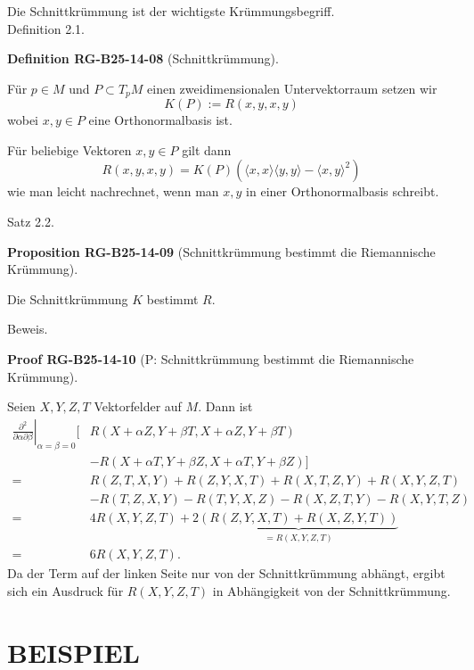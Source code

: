 \documentclass[10pt, letterpaper]{article}
\newcommand{\CustomHeading}[3]{%
  \par\medskip\noindent%
  \textbf{#1 #2} \textnormal{(#3)}.\enskip%
}
\newenvironment{DEF}[2]{\begin{unitbox}\CustomHeading{Definition}{#1}{#2}}{\end{unitbox}}
\newenvironment{PROP}[2]{\begin{unitbox}\CustomHeading{Proposition}{#1}{#2}}{\end{unitbox}}
\newenvironment{PROOF}[2]{\begin{unitbox}\CustomHeading{Proof}{#1}{#2}}{\end{unitbox}}
\begin{document}
Die Schnittkrümmung ist der wichtigste Krümmungsbegriff.\\



Definition 2.1. 


\begin{DEF}{RG-B25-14-08}{Schnittkrümmung}
Für $p \in M$ und $P \subset T_{p} M$ einen zweidimensionalen Untervektorraum setzen wir
$$
K(P):=R(x, y, x, y)
$$
wobei $x, y \in P$ eine Orthonormalbasis ist.

Für beliebige Vektoren $x, y \in P$ gilt dann
$$
R(x, y, x, y)=K(P)\left(\langle x, x\rangle\langle y, y\rangle-\langle x, y\rangle^{2}\right)
$$
wie man leicht nachrechnet, wenn man $x, y$ in einer Orthonormalbasis schreibt.
\end{DEF}



Satz 2.2. 

\begin{PROP}{RG-B25-14-09}{Schnittkrümmung bestimmt die Riemannische Krümmung}
Die Schnittkrümmung $K$ bestimmt $R$.
\end{PROP}


Beweis. 

\begin{PROOF}{RG-B25-14-10}{P: Schnittkrümmung bestimmt die Riemannische Krümmung}
Seien $X, Y, Z, T$ Vektorfelder auf $M$. Dann ist
$$
\begin{aligned}
\left.\frac{\partial^{2}}{\partial \alpha \partial \beta}\right|_{\alpha=\beta=0}[ & R(X+\alpha Z, Y+\beta T, X+\alpha Z, Y+\beta T) \\
& -R(X+\alpha T, Y+\beta Z, X+\alpha T, Y+\beta Z)] \\
= & R(Z, T, X, Y)+R(Z, Y, X, T)+R(X, T, Z, Y)+R(X, Y, Z, T) \\
& -R(T, Z, X, Y)-R(T, Y, X, Z)-R(X, Z, T, Y)-R(X, Y, T, Z) \\
= & 4 R(X, Y, Z, T)+2 \underbrace{(R(Z, Y, X, T)+R(X, Z, Y, T))}_{=R(X, Y, Z, T)} \\
= & 6 R(X, Y, Z, T) .
\end{aligned}
$$
Da der Term auf der linken Seite nur von der Schnittkrümmung abhängt, ergibt sich ein Ausdruck für $R(X, Y, Z, T)$ in Abhängigkeit von der Schnittkrümmung.
\end{PROOF}



\section*{BEISPIEL}
\end{document}
